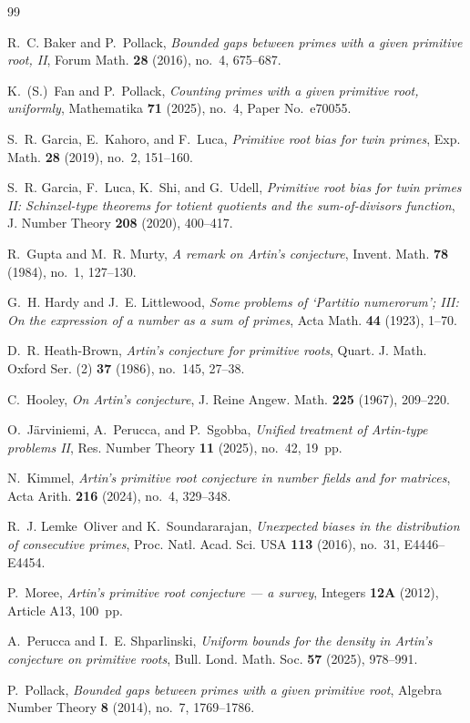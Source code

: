 \documentclass[11pt,reqno]{amsart}
\theoremstyle{plain}
\theoremstyle{definition}
\begin{document}
\begin{thebibliography}{99}

R.~C. Baker and P.~Pollack,
\emph{Bounded gaps between primes with a given primitive root, II},
Forum Math. \textbf{28} (2016), no.~4, 675--687.

K.~(S.)~Fan and P.~Pollack,
\emph{Counting primes with a given primitive root, uniformly},
Mathematika \textbf{71} (2025), no.~4, Paper No.~e70055.

S.~R. Garcia, E.~Kahoro, and F.~Luca,
\emph{Primitive root bias for twin primes},
Exp. Math. \textbf{28} (2019), no.~2, 151--160.

S.~R. Garcia, F.~Luca, K.~Shi, and G.~Udell,
\emph{Primitive root bias for twin primes II: Schinzel-type theorems for
totient quotients and the sum-of-divisors function},
J. Number Theory \textbf{208} (2020), 400--417.

R.~Gupta and M.~R. Murty,
\emph{A remark on Artin's conjecture},
Invent. Math. \textbf{78} (1984), no.~1, 127--130.

G.~H. Hardy and J.~E. Littlewood,
\emph{Some problems of `Partitio numerorum'; III: On the expression of a
number as a sum of primes},
Acta Math. \textbf{44} (1923), 1--70.

D.~R. Heath-Brown,
\emph{Artin's conjecture for primitive roots},
Quart. J. Math. Oxford Ser. (2) \textbf{37} (1986), no.~145, 27--38.

C.~Hooley,
\emph{On Artin's conjecture},
J. Reine Angew. Math. \textbf{225} (1967), 209--220.

O.~J\"arviniemi, A.~Perucca, and P.~Sgobba,
\emph{Unified treatment of Artin-type problems II},
Res. Number Theory \textbf{11} (2025), no.~42, 19~pp.

N.~Kimmel,
\emph{Artin's primitive root conjecture in number fields and for matrices},
Acta Arith. \textbf{216} (2024), no.~4, 329--348.

R.~J. Lemke~Oliver and K.~Soundararajan,
\emph{Unexpected biases in the distribution of consecutive primes},
Proc. Natl. Acad. Sci. USA \textbf{113} (2016), no.~31, E4446--E4454.

P.~Moree,
\emph{Artin's primitive root conjecture --- a survey},
Integers \textbf{12A} (2012), Article A13, 100~pp.

A.~Perucca and I.~E. Shparlinski,
\emph{Uniform bounds for the density in Artin's conjecture on primitive roots},
Bull. Lond. Math. Soc. \textbf{57} (2025), 978--991.

P.~Pollack,
\emph{Bounded gaps between primes with a given primitive root},
Algebra Number Theory \textbf{8} (2014), no.~7, 1769--1786.

\end{thebibliography}
\end{document}
